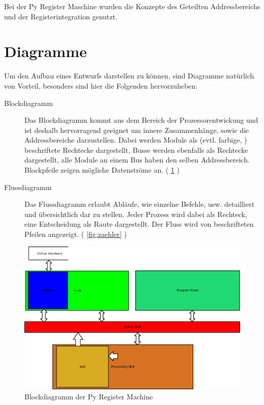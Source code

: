 \documentclass[a4paper,12pt,oneside]{scrreprt}
\begin{document}
Bei der Py Register Maschine wurden die Konzepte des Geteilten Addressbereichs und der Registerintegration genutzt.

\section{Diagramme}

Um den Aufbau eines Entwurfs darstellen zu können, sind Diagramme natürlich von Vorteil, besonders sind hier die Folgenden hervorzuheben:

\begin{description}

\item[Blockdiagramm] Das Blockdiagramm kommt aus dem Bereich der Prozessorentwickung und ist deshalb hervorragend geeignet um innere Zusammenhänge,
sowie die Addressbereiche darzustellen. Dabei werden Module als (evtl. farbige, ) beschriftete Rechtecke dargestellt, Busse werden ebenfalls als Rechtecke dargestellt, alle Module an einem Bus haben den selben Addressbereich.
Blockpfeile zeigen mögliche Datenströme an. ( \ref{fig:bloecke} )

\item[Flussdiagramm] Das Flussdiagramm erlaubt Abläufe, wie einzelne Befehle, usw. detailliert und übersichtlich dar zu stellen.
Jeder Prozess wird dabei als Rechteck, eine Entscheidung als Raute dargestellt. 
Der Fluss wird von beschrifteten Pfeilen angezeigt. ( \ref{fig:zaehler} )

\end{description}

\begin{figure}
\centering
\includegraphics[width=\linewidth]{bloecke.png}
\caption[Blockdiagramm]{Blockdiagramm der Py Register Machine}
\label{fig:bloecke}
\end{figure}
\end{document}
